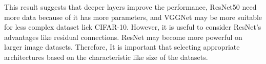 \documentclass[extendedabs]{bmvc2k}
\begin{document}
This result suggests that deeper layers improve the performance, ResNet50 need more data because of it has more parameters, and VGGNet may be more suitable for less complex dataset lick CIFAR-10. However, it is useful to consider ResNet's advantages like residual connections. ResNet may become more powerful on larger image datasets. Therefore, It is important that selecting appropriate architectures based on the characteristic like size of the datasets.

\newpage

\end{document}
